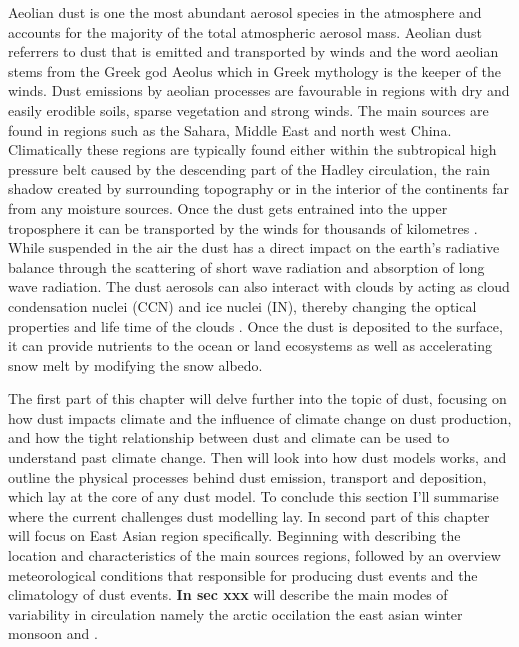 \thispagestyle{empty}
Aeolian dust is one the most abundant aerosol species in the atmosphere and accounts for the majority of the total atmospheric  aerosol mass. Aeolian dust referrers to dust that is emitted and transported by winds and the word aeolian stems from the Greek god Aeolus which in Greek mythology is the keeper of the winds.  Dust emissions by aeolian processes are favourable in regions with dry and easily erodible soils, sparse vegetation and strong winds. The main sources are found in regions such as the Sahara, Middle East and north west China. Climatically these regions are typically found either within the subtropical high pressure belt caused by the descending part of the Hadley circulation, the rain shadow created by surrounding topography or in the interior of the continents far from any moisture sources. Once the dust gets entrained into the upper troposphere it can be transported by the winds for thousands of kilometres \parencite{yumimoto_elevated_2009}. While suspended in the air the dust has a direct impact on the earth’s radiative balance through the scattering of short wave radiation and absorption of long wave radiation. The dust aerosols can also interact with clouds by acting as cloud condensation nuclei (CCN) and ice nuclei (IN), thereby changing the optical properties and life time of the clouds \parencite{lohmann2006sensitivity}. Once the dust is deposited to the surface, it can provide nutrients to the ocean \parencite{jickells_dust_biogeo_2015} or land ecosystems as well as accelerating snow melt by modifying the snow albedo. 

The first part of this chapter will delve further into the topic of dust, focusing on how dust impacts climate and the influence of climate change on dust production, and how the tight relationship between dust and climate can be used to understand past climate change. Then  will look into how dust models works, and outline the physical processes behind dust emission, transport and deposition, which lay at the core of any dust model. To conclude this section I'll summarise where the current challenges dust modelling lay. In second part of this chapter will focus on East Asian region specifically. Beginning with describing the location and characteristics of the main sources regions, followed by an overview meteorological conditions that responsible for producing dust events and the climatology of dust events. \textbf{In sec xxx} will describe the main modes of variability in circulation namely the arctic occilation the east asian winter monsoon and . 


